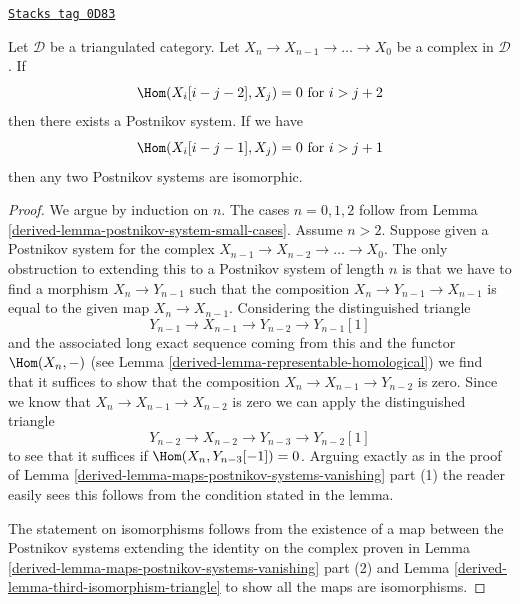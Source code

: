 \begin{lemma}
\label{derived-lemma-existence-postnikov-system}
\href{https://stacks.math.columbia.edu/tag/0D83}{\texttt{Stacks tag 0D83}}

Let $\mathcal{D}$ be a triangulated category.
Let $X_n \to X_{n - 1} \to \ldots \to X_0$ be
a complex in $\mathcal{D}$. If
$$
\Hom(X_i[i - j - 2], X_j) = 0 \text{ for }i > j + 2
$$
then there exists a Postnikov system. If we have
$$
\Hom(X_i[i - j - 1], X_j) = 0 \text{ for }i > j + 1
$$
then any two Postnikov systems are isomorphic.
\end{lemma}

\begin{proof}

We argue by induction on $n$. The cases $n = 0, 1, 2$
follow from Lemma \ref{derived-lemma-postnikov-system-small-cases}.
Assume $n > 2$.
Suppose given a Postnikov system for the complex
$X_{n - 1} \to X_{n - 2} \to \ldots \to X_0$.
The only obstruction to extending this to a Postnikov system
of length $n$ is that we have to find a morphism
$X_n \to Y_{n - 1}$ such that the composition
$X_n \to Y_{n - 1} \to X_{n - 1}$ is equal to the given map
$X_n \to X_{n - 1}$. Considering the distinguished triangle
$$
Y_{n - 1} \to X_{n - 1} \to Y_{n - 2} \to Y_{n - 1}[1]
$$
and the associated long exact sequence coming from this
and the functor $\Hom(X_n, -)$
(see Lemma \ref{derived-lemma-representable-homological})
we find that it suffices to show that the composition
$X_n \to X_{n - 1} \to Y_{n - 2}$ is zero.
Since we know that $X_n \to X_{n - 1} \to X_{n - 2}$ is zero
we can apply the distinguished triangle
$$
Y_{n - 2} \to X_{n - 2} \to Y_{n - 3} \to Y_{n - 2}[1]
$$
to see that it suffices if $\Hom(X_n, Y_{n - 3}[-1]) = 0$.
Arguing exactly as in the proof of
Lemma \ref{derived-lemma-maps-postnikov-systems-vanishing} part (1)
the reader easily sees this follows from the condition
stated in the lemma.

\medskip\noindent
The statement on isomorphisms follows from the existence of a map
between the Postnikov systems extending the identity on the complex
proven in Lemma \ref{derived-lemma-maps-postnikov-systems-vanishing} part (2)
and Lemma \ref{derived-lemma-third-isomorphism-triangle} to show all the maps are
isomorphisms.
\end{proof}

